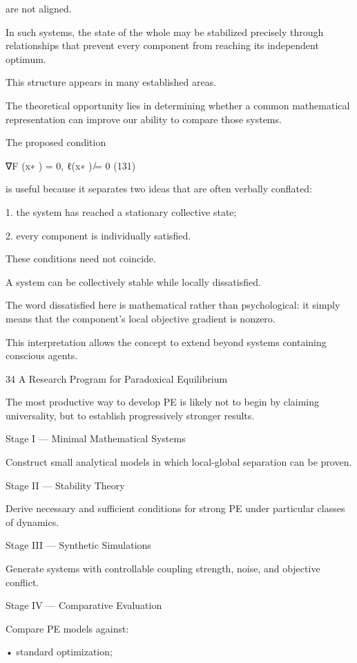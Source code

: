 \documentclass[10pt,a4paper]{article}
\begin{document}
\begin{ManuscriptText}
are not aligned.

In such systems, the state of the whole may be stabilized precisely through relationships that
prevent every component from reaching its independent optimum.

This structure appears in many established areas.

The theoretical opportunity lies in determining whether a common mathematical representation
can improve our ability to compare those systems.

The proposed condition


                                   ∇F (x∗ ) = 0,        ℓ(x∗ ) ̸= 0                        (131)

is useful because it separates two ideas that are often verbally conflated:


   1. the system has reached a stationary collective state;

   2. every component is individually satisfied.


These conditions need not coincide.

A system can be collectively stable while locally dissatisfied.

The word dissatisfied here is mathematical rather than psychological: it simply means that the
component’s local objective gradient is nonzero.

This interpretation allows the concept to extend beyond systems containing conscious agents.


34     A Research Program for Paradoxical Equilibrium

The most productive way to develop PE is likely not to begin by claiming universality, but to
establish progressively stronger results.


Stage I — Minimal Mathematical Systems

Construct small analytical models in which local-global separation can be proven.


Stage II — Stability Theory

Derive necessary and sufficient conditions for strong PE under particular classes of dynamics.


Stage III — Synthetic Simulations

Generate systems with controllable coupling strength, noise, and objective conflict.


Stage IV — Comparative Evaluation

Compare PE models against:

  • standard optimization;


\end{ManuscriptText}
\end{document}
